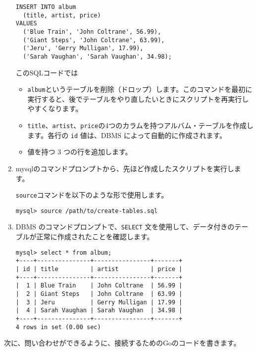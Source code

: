 \begin{enumerate}
\begin{lstlisting}[numbers=none]
INSERT INTO album
  (title, artist, price)
VALUES
  ('Blue Train', 'John Coltrane', 56.99),
  ('Giant Steps', 'John Coltrane', 63.99),
  ('Jeru', 'Gerry Mulligan', 17.99),
  ('Sarah Vaughan', 'Sarah Vaughan', 34.98);
\end{lstlisting}

このSQLコードでは

\begin{itemize}
\item \texttt{album}というテーブルを削除（ドロップ）します。このコマンドを最初に実行すると、後でテーブルをやり直したいときにスクリプトを再実行しやすくなります。

\item \texttt{title}、\texttt{artist}、\texttt{price}の4つのカラムを持つアルバム・テーブルを作成します。各行の \texttt{id} 値は、DBMS によって自動的に作成されます。

\item 値を持つ 3 つの行を追加します。
\end{itemize}

\item mysqlのコマンドプロンプトから、先ほど作成したスクリプトを実行します。

\texttt{source}コマンドを以下のような形で使用します。

\begin{lstlisting}[numbers=none]
mysql> source /path/to/create-tables.sql
\end{lstlisting}

\item DBMS のコマンドプロンプトで、\texttt{SELECT} 文を使用して、データ付きのテーブルが正常に作成されたことを確認します。

\begin{lstlisting}[numbers=none]
mysql> select * from album;
+----+---------------+----------------+-------+
| id | title         | artist         | price |
+----+---------------+----------------+-------+
|  1 | Blue Train    | John Coltrane  | 56.99 |
|  2 | Giant Steps   | John Coltrane  | 63.99 |
|  3 | Jeru          | Gerry Mulligan | 17.99 |
|  4 | Sarah Vaughan | Sarah Vaughan  | 34.98 |
+----+---------------+----------------+-------+
4 rows in set (0.00 sec)
\end{lstlisting}
\end{enumerate}

次に、問い合わせができるように、接続するためのGoのコードを書きます。

